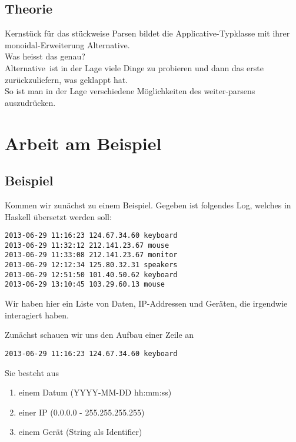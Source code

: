 \documentclass{beamer}
\begin{document}
\subsection{Theorie}
\begin{frame}[fragile]
Kernstück für das stückweise Parsen bildet die Applicative-Typklasse mit ihrer monoidal-Erweiterung \glqq Alternative\grqq .\\
\pause
\bigskip
Was heisst das genau?\\
\bigskip
\pause
\glqq Alternative\grqq \  ist in der Lage viele Dinge zu probieren und dann das erste zurückzuliefern, was geklappt hat.\\
So ist man in der Lage verschiedene Möglichkeiten des weiter-parsens auszudrücken.
\end{frame}

\section{Arbeit am Beispiel}
\subsection{Beispiel}
\begin{frame}[fragile]
Kommen wir zunächst zu einem Beispiel. Gegeben ist folgendes Log, welches in Haskell übersetzt werden soll:
\small
\begin{verbatim}
2013-06-29 11:16:23 124.67.34.60 keyboard
2013-06-29 11:32:12 212.141.23.67 mouse
2013-06-29 11:33:08 212.141.23.67 monitor
2013-06-29 12:12:34 125.80.32.31 speakers
2013-06-29 12:51:50 101.40.50.62 keyboard
2013-06-29 13:10:45 103.29.60.13 mouse
\end{verbatim}
\normalsize
Wir haben hier ein Liste von Daten, IP-Addressen und Geräten, die irgendwie interagiert haben.
\end{frame}

\begin{frame}[fragile]
Zunächst schauen wir uns den Aufbau einer Zeile an
\begin{verbatim}
2013-06-29 11:16:23 124.67.34.60 keyboard
\end{verbatim}
\pause
Sie besteht aus
\begin{enumerate}
 \item einem Datum (YYYY-MM-DD hh:mm:ss)
 \item einer IP (0.0.0.0 - 255.255.255.255)
 \item einem Gerät (String als Identifier)
\end{enumerate}
\end{frame}
\end{document}
